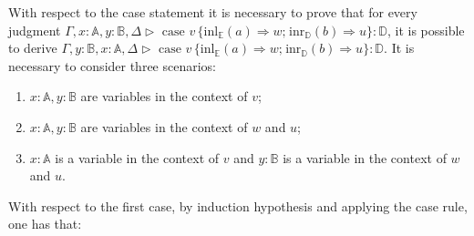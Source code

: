 With respect to the case statement it is necessary to prove that for every judgment $\Gamma, x:\mathbb{A}, y:\mathbb{B}, \Delta \triangleright \text{ case } v \hspace{2pt} \{\text{inl}_{\mathbb{E}}  (a) \Rightarrow w ; \hspace{1pt} \text{inr}_{\mathbb{D}}  (b) \Rightarrow u\}: \mathbb{D}$, it is possible to derive $\Gamma, y:\mathbb{B}, x:\mathbb{A}, \Delta \triangleright \text{ case } v \hspace{2pt} \{\text{inl}_{\mathbb{E}} (a) \Rightarrow w ; \hspace{1pt} \text{inr}_{\mathbb{D}} (b) \Rightarrow u\}: \mathbb{D}$. It is necessary to consider three scenarios:
\begin{enumerate}
  \item $x:\mathbb{A}, y:\mathbb{B}$ are variables in the context of $v$;
  \item $x:\mathbb{A}, y:\mathbb{B}$ are variables in the context of $w$ and $u$;
  \item  $x:\mathbb{A}$ is a variable in the context of $v$ and $y:\mathbb{B}$ is a variable in the context of $w$ and $u$.
\end{enumerate}

With respect to the first case, by induction hypothesis and applying the case rule, one has that:

